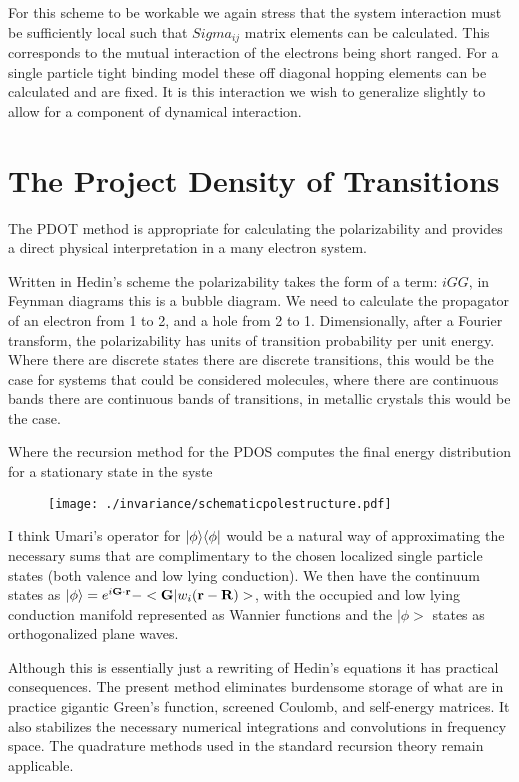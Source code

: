 For this scheme to be workable we again stress that the system interaction
must be sufficiently local such that $Sigma_{ij}$ matrix elements can be
calculated. This corresponds to the mutual interaction of the electrons being 
short ranged. For a single particle tight binding model these off diagonal hopping
elements can be calculated and are fixed. It is this interaction we wish
to generalize slightly to allow for a component of dynamical interaction.

\section{The Project Density of Transitions}
  The PDOT\cite{annett93, haydock00, haydock16} method is 
appropriate for calculating the polarizability and provides a direct physical
interpretation in a many electron system. 

Written in Hedin's scheme the polarizability 
takes the form of a term: $iGG$, in Feynman diagrams this is a bubble diagram. We need to calculate the propagator
of an electron from 1 to 2, and a hole from 2 to 1. Dimensionally, after a Fourier transform,
the polarizability has units of transition probability per unit energy. Where there are discrete
states there are discrete transitions, this would be the case for systems
that could be considered molecules, where there are continuous bands there are continuous
bands of transitions, in metallic crystals this would be the case.

Where the recursion method for the PDOS computes the final energy distribution
for a stationary state in the syste

\begin{figure}
\texttt{[image: ./invariance/schematicpolestructure.pdf]}
\end{figure}

I think Umari's operator for $|\phi\rangle\langle\phi|$ would be a natural way of
approximating the necessary sums that are complimentary to the chosen
localized single particle states (both valence and low lying conduction).
We then have the continuum states as $|\phi\rangle=e^{i{\bf G}\cdot{\bf r}}-<{\bf G}|w_{i}({\bf r}-{\bf R})>$,
with the occupied and low lying conduction manifold represented as Wannier 
functions and the $|\phi>$ states as orthogonalized plane waves.

	Although this is essentially just a rewriting of Hedin's equations
it has practical consequences. The present method eliminates
burdensome storage of what are in practice gigantic Green's function, 
screened Coulomb, and self-energy matrices. It also 
stabilizes the necessary numerical integrations and convolutions in frequency space. 
The quadrature methods used in the standard recursion theory remain applicable.

